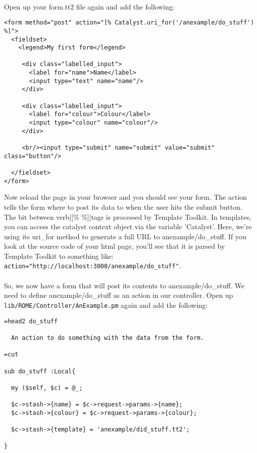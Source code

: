 \paragraph*{}
Open up your form.tt2 file again and add the following:

\begin{verbatim}
<form method="post" action="[% Catalyst.uri_for('/anexample/do_stuff') %]">
  <fieldset>
    <legend>My first form</legend>
    
     <div class="labelled_input">
       <label for="name">Name</label>
       <input type="text" name="name"/>
     </div>  

     <div class="labelled_input">
       <label for="colour">Colour</label>
       <input type="colour" name="colour"/>
     </div>

     <br/><input type="submit" name="submit" value="submit" class="button"/> 

  </fieldset>
</form>
\end{verbatim}

Now reload the page in your browser and you should see your form. The action tells the form where to post its data to when the user hits the submit button. The bit between verb|[\% \%]|tags is processed by Template Toolkit. In templates, you can access the catalyst context object via the variable 'Catalyst'. Here, we're using its uri\_for method to generate a full URL to anexample/do\_stuff. If you look at the source code of your html page, you'll see that it is parsed by Template Toolkit to something like: \verb|action="http://localhost:3000/anexample/do_stuff"|.

\paragraph*{}
So, we now have a form that will post its contents to anexample/do\_stuff. We need to define anexample/do\_stuff as an action in our controller. Open up \verb|lib/ROME/Controller/AnExample.pm| again and add the following:

\begin{verbatim}
=head2 do_stuff

  An action to do something with the data from the form.

=cut

sub do_stuff :Local{

  my ($self, $c) = @_;
  
  $c->stash->{name} = $c->request->params->{name};
  $c->stash->{colour} = $c->request->params->{colour}; 
  
  $c->stash->{template} = 'anexample/did_stuff.tt2';

}
\end{verbatim}

